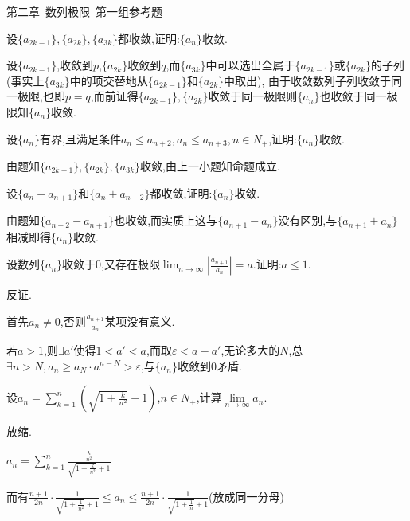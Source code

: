 \documentclass{exam}
\begin{document}
\begin{center}
    \Large 第二章\, 数列极限\, 第一组参考题
\end{center}

\begin{questions}

    \question
    设$\{a_{2k-1}\},\{a_{2k}\},\{a_{3k}\}$都收敛,证明:$\{a_n\}$收敛.
    \begin{solution}
        设$\{a_{2k-1}\}$,收敛到$p$,$\{a_{2k}\}$收敛到$q$,而$\{a_{3k}\}$中可以选出全属于$\{a_{2k-1}\}$或$\{a_{2k}\}$的子列(事实上$\{a_{3k}\}$中的项交替地从$\{a_{2k-1}\}$和$\{a_{2k}\}$中取出),
        由于收敛数列子列收敛于同一极限,也即$p=q$,而前证得$\{a_{2k-1}\},\{a_{2k}\}$收敛于同一极限则$\{a_n\}$也收敛于同一极限知$\{a_n\}$收敛.
    \end{solution}

    \question
    设$\{a_n\}$有界,且满足条件$a_n\leqslant a_{n+2},a_n\leqslant a_{n+3},n\in N_+$,证明:$\{a_n\}$收敛.
    \begin{solution}
        由题知$\{a_{2k-1}\},\{a_{2k}\},\{a_{3k}\}$收敛,由上一小题知命题成立.
    \end{solution}

    \question
    设$\{a_n+a_{n+1}\}$和$\{a_n+a_{n+2}\}$都收敛,证明:$\{a_n\}$收敛.
    \begin{solution}
        由题知$\{a_{n+2}-a_{n+1}\}$也收敛,而实质上这与$\{a_{n+1}-a_n\}$没有区别,与$\{a_{n+1}+a_n\}$相减即得$\{a_n\}$收敛.
    \end{solution}

    \question
    设数列$\{a_n\}$收敛于0,又存在极限$\lim _{n\to\infty} \left| \frac {a_{n+1}}{a_n} \right|=a$.证明:$a\leqslant 1$.
    \begin{solution}
        反证.

        首先$a_n\neq0$,否则$\frac{a_{n+1}}{a_n}$某项没有意义.

        若$a>1$,则$\exists a'$使得$1<a'<a$,而取$\varepsilon<a-a'$,无论多大的$N$,总
        $\exists n>N,a_n\geqslant a_N\cdot a^{n-N}>\varepsilon$,与$\{a_n\}$收敛到0矛盾.
    \end{solution}

    \question
    设$a_n=\sum\limits _{k=1}^n \left(\sqrt{1+\frac{k}{n^2}}-1\right)$,$n\in N_+$,计算$\lim\limits _{n\to \infty}a_n$.
    \begin{solution}
        放缩.

        $a_n=\sum_{k=1}^n \frac{\frac{k}{n^2}}{\sqrt{1+\frac{k}{n^2}}+1}$

        而有$\frac{n+1}{2n}\cdot \frac{1}{\sqrt{1+\frac{1}{n^2}}+1}\leqslant a_n \leqslant \frac{n+1}{2n}\cdot\frac{1}{\sqrt{1+\frac{1}{n}}+1}$(放成同一分母)


\end{solution}
\end{questions}
\end{document}
